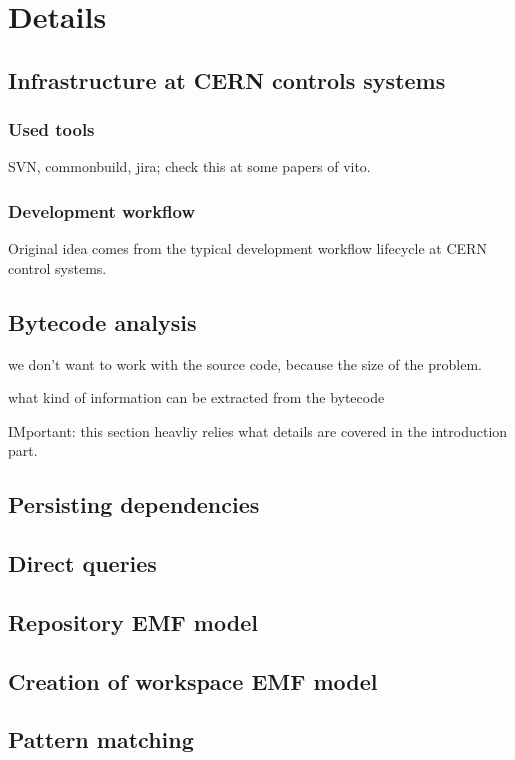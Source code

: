 \chapter{Details}

\section{Infrastructure at CERN controls systems}

\subsection{Used tools}
SVN, commonbuild, jira; check this at some papers of vito.

\subsection{Development workflow}
Original idea comes from the typical development workflow lifecycle at CERN control systems. 

\section{Bytecode analysis}
we don't want to work with the source code, because the size of the problem.

what kind of information can be extracted from the bytecode

IMportant: this section heavliy relies what details are covered in the introduction part.

\section{Persisting dependencies} 

\section{Direct queries}

\section{Repository EMF model}

\section{Creation of workspace EMF model}

\section{Pattern matching}

